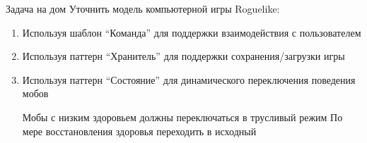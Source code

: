 \documentclass{../../slides-style}
\begin{document}
    \begin{frame}{Задача на дом}
        Уточнить модель компьютерной игры Roguelike:

        \begin{enumerate}
            \item Используя шаблон \enquote{Команда} для поддержки взаимодействия с пользователем
            \item Используя паттерн \enquote{Хранитель} для поддержки сохранения/загрузки игры
            \item Используя паттерн \enquote{Состояние} для динамического переключения поведения мобов
            \begin{outline}
                \1 Мобы с низким здоровьем должны переключаться в трусливый режим
                \1 По мере восстановления здоровья переходить в исходный
            \end{outline}
        \end{enumerate}
    \end{frame}
\end{document}
